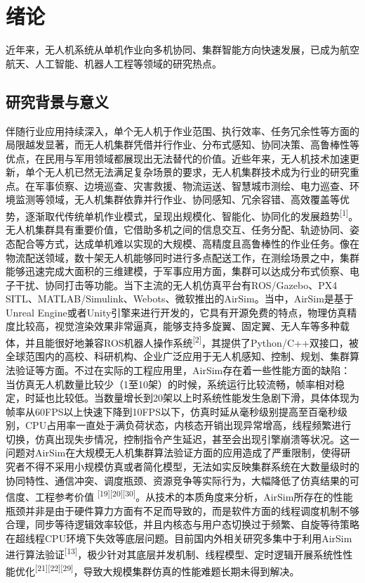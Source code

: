 
\chapter{绪论}

近年来，无人机系统从单机作业向多机协同、集群智能方向快速发展，已成为航空航天、人工智能、机器人工程等领域的研究热点。

\section{研究背景与意义}

伴随行业应用持续深入，单个无人机于作业范围、执行效率、任务冗余性等方面的局限越发显著，而无人机集群凭借并行作业、分布式感知、协同决策、高鲁棒性等优点，在民用与军用领域都展现出无法替代的价值。近些年来，无人机技术加速更新，单个无人机已然无法满足复杂场景的要求，无人机集群技术成为行业的研究重点。在军事侦察、边境巡查、灾害救援、物流运送、智慧城市测绘、电力巡查、环境监测等领域，无人机集群依靠并行作业、协同感知、冗余容错、高效覆盖等优势，逐渐取代传统单机作业模式，呈现出规模化、智能化、协同化的发展趋势\textsuperscript{{[}1{]}}。无人机集群具有重要价值，它借助多机之间的信息交互、任务分配、轨迹协同、姿态配合等方式，达成单机难以实现的大规模、高精度且高鲁棒性的作业任务。像在物流配送领域，数十架无人机能够同时进行多点配送工作，在测绘场景之中，集群能够迅速完成大面积的三维建模，于军事应用方面，集群可以达成分布式侦察、电子干扰、协同打击等功能。当下主流的无人机仿真平台有ROS/Gazebo、PX4
SITL、MATLAB/Simulink、Webots、微软推出的AirSim。当中，AirSim是基于Unreal
Engine或者Unity引擎来进行开发的，它具有开源免费的特点，物理仿真精度比较高，视觉渲染效果非常逼真，能够支持多旋翼、固定翼、无人车等多种载体，并且能很好地兼容ROS机器人操作系统\textsuperscript{{[}2{]}}，其提供了Python/C++双接口，被全球范围内的高校、科研机构、企业广泛应用于无人机感知、控制、规划、集群算法验证等方面。不过在实际的工程应用里，AirSim存在着一些性能方面的缺陷：当仿真无人机数量比较少（1至10架）的时候，系统运行比较流畅，帧率相对稳定，时延也比较低。当数量增长到20架以上时系统性能发生急剧下滑，具体体现为帧率从60FPS以上快速下降到10FPS以下，仿真时延从毫秒级别提高至百毫秒级别，CPU占用率一直处于满负荷状态，内核态开销出现异常增高，线程频繁进行切换，仿真出现失步情况，控制指令产生延迟，甚至会出现引擎崩溃等状况。这一问题对AirSim在大规模无人机集群算法验证方面的应用造成了严重限制，使得研究者不得不采用小规模仿真或者简化模型，无法如实反映集群系统在大数量级时的协同特性、通信冲突、调度瓶颈、资源竞争等实际行为，大幅降低了仿真结果的可信度、工程参考价值
\textsuperscript{{[}19{]}{[}20{]}{[}30{]}}。从技术的本质角度来分析，AirSim所存在的性能瓶颈并非是由于硬件算力方面有不足而导致的，而是软件方面的线程调度机制不够合理，同步等待逻辑效率较低，并且内核态与用户态切换过于频繁、自旋等待策略在超线程CPU环境下失效等底层问题。目前国内外相关研究多集中于利用AirSim进行算法验证\textsuperscript{{[}13{]}}，极少针对其底层并发机制、线程模型、定时逻辑开展系统性性能优化\textsuperscript{{[}21{]}{[}22{]}{[}29{]}}，导致大规模集群仿真的性能难题长期未得到解决。

